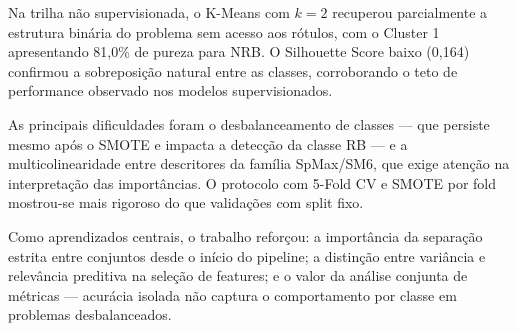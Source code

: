\documentclass[12pt, a4paper]{article}
\begin{document}
Na trilha não supervisionada, o K-Means com $k=2$ recuperou parcialmente a
estrutura binária do problema sem acesso aos rótulos, com o Cluster 1
apresentando 81,0\% de pureza para NRB. O Silhouette Score baixo (0,164)
confirmou a sobreposição natural entre as classes, corroborando o teto de
performance observado nos modelos supervisionados.

As principais dificuldades foram o desbalanceamento de classes --- que persiste
mesmo após o SMOTE e impacta a detecção da classe RB --- e a multicolinearidade
entre descritores da família SpMax/SM6, que exige atenção na interpretação
das importâncias. O protocolo com 5-Fold CV e SMOTE por fold mostrou-se mais
rigoroso do que validações com split fixo.

Como aprendizados centrais, o trabalho reforçou: a importância da separação
estrita entre conjuntos desde o início do pipeline; a distinção entre variância
e relevância preditiva na seleção de features; e o valor da análise conjunta
de métricas --- acurácia isolada não captura o comportamento por classe em
problemas desbalanceados.



\end{document}
